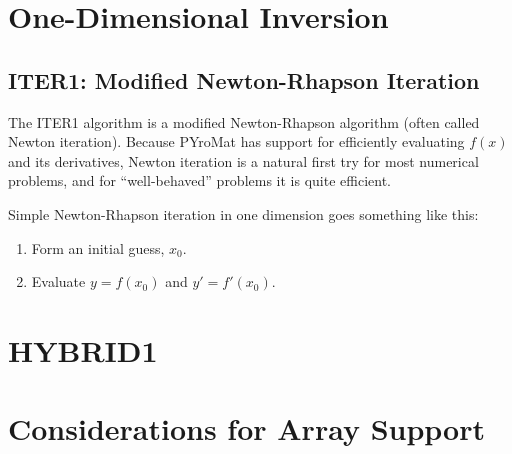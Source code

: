 \documentclass{article}
\begin{document}
\section{One-Dimensional Inversion}

\subsection{ITER1: Modified Newton-Rhapson Iteration}

The ITER1 algorithm is a modified Newton-Rhapson algorithm (often called Newton iteration).  Because PYroMat has support for efficiently evaluating $f(x)$ and its derivatives, Newton iteration is a natural first try for most numerical problems, and for ``well-behaved'' problems it is quite efficient.  

Simple Newton-Rhapson iteration in one dimension goes something like this:
\begin{enumerate}
\item Form an initial guess, $x_0$.
\item Evaluate $y=f(x_0)$ and $y' = f'(x_0)$.
\end{enumerate}



\section{HYBRID1}

\section{Considerations for Array Support}
\end{document}
